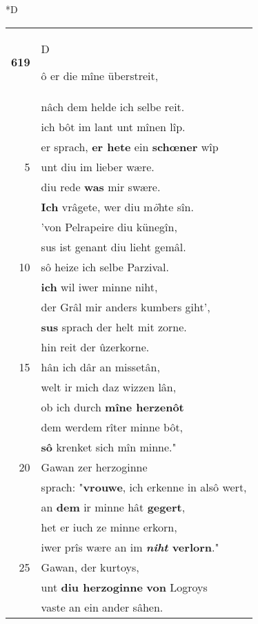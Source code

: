 \documentclass[8pt,a4paper,notitlepage]{article}
\begin{document}
\begin{table}[ht]
\begin{minipage}[t]{0.5\linewidth}
\small
\begin{center}*D
\end{center}
\begin{tabular}{rl}
\textbf{619} & \begin{large}D\end{large}ô er die mîne überstreit,\\ 
 & nâch dem helde ich selbe reit.\\ 
 & ich bôt im lant unt mînen lîp.\\ 
 & er sprach, \textbf{er hete} ein \textbf{schœner} wîp\\ 
5 & unt diu im lieber wære.\\ 
 & diu rede \textbf{was} mir swære.\\ 
 & \textbf{Ich} vrâgete, wer diu m\textit{ö}hte sîn.\\ 
 & 'von Pelrapeire diu künegîn,\\ 
 & sus ist genant diu lieht gemâl.\\ 
10 & sô heize ich selbe Parzival.\\ 
 & \textbf{ich} wil iwer minne niht,\\ 
 & der Grâl mir anders kumbers giht',\\ 
 & \textbf{sus} sprach der helt mit zorne.\\ 
 & hin reit der ûzerkorne.\\ 
15 & hân ich dâr an missetân,\\ 
 & welt ir mich daz wizzen lân,\\ 
 & ob ich durch \textbf{mîne herzenôt}\\ 
 & dem werdem rîter minne bôt,\\ 
 & \textbf{sô} krenket sich mîn minne."\\ 
20 & Gawan zer herzoginne\\ 
 & sprach: "\textbf{vrouwe}, ich erkenne in alsô wert,\\ 
 & an \textbf{dem} ir minne hât \textbf{gegert},\\ 
 & het er iuch ze minne erkorn,\\ 
 & iwer prîs wære an im \textbf{\textit{niht} verlorn}."\\ 
25 & Gawan, der kurtoys,\\ 
 & unt \textbf{diu herzoginne} \textbf{von} Logroys\\ 
 & vaste an ein ander sâhen.\\ 

\end{tabular}
\end{minipage}
\end{table}
\end{document}
